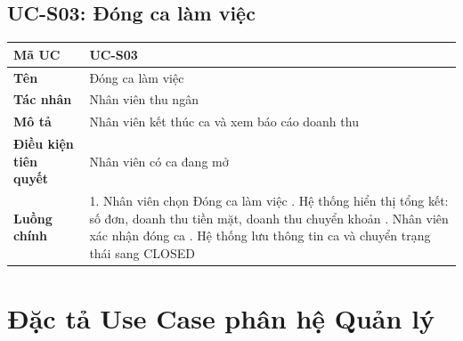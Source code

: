 \documentclass[../20232006p.tex]{subfiles}
\begin{document}
\subsection{UC-S03: Đóng ca làm việc}
\begin{table}[H]
    \centering
    \begin{tabular}{|p{3.5cm}|p{10cm}|}
        \hline
        \textbf{Mã UC}                & UC-S03                                         \\
        \hline
        \textbf{Tên}                  & Đóng ca làm việc                               \\
        \hline
        \textbf{Tác nhân}             & Nhân viên thu ngân                             \\
        \hline
        \textbf{Mô tả}                & Nhân viên kết thúc ca và xem báo cáo doanh thu \\
        \hline
        \textbf{Điều kiện tiên quyết} & Nhân viên có ca đang mở                        \\
        \hline
        \textbf{Luồng chính}          &
        1. Nhân viên chọn Đóng ca làm việc \newline
        2. Hệ thống hiển thị tổng kết: số đơn, doanh thu tiền mặt, doanh thu chuyển khoản \newline
        3. Nhân viên xác nhận đóng ca \newline
        4. Hệ thống lưu thông tin ca và chuyển trạng thái sang CLOSED                  \\
        \hline
    \end{tabular}
\end{table}

\section{Đặc tả Use Case phân hệ Quản lý}
\end{document}
